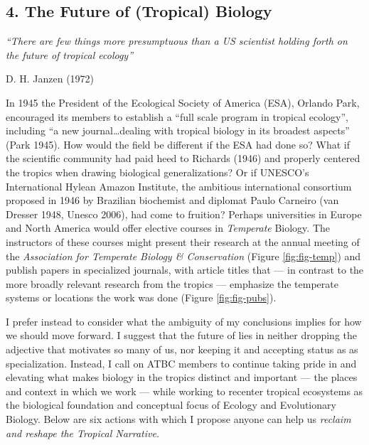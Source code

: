 \documentclass[
  12pt,
  man, donotrepeattitle,floatsintext]{apa6}
\begin{document}
\hypertarget{the-future-of-tropical-biology}{%
\subsection{4. The Future of (Tropical) Biology}\label{the-future-of-tropical-biology}}

\emph{``There are few things more presumptuous than a US scientist holding forth on the future of tropical ecology''}

\hfill D. H. Janzen (1972)

\bigskip

\noindent In 1945 the President of the Ecological Society of America (ESA), Orlando Park, encouraged its members to establish a ``full scale program in tropical ecology'', including ``a new journal\ldots dealing with tropical biology in its broadest aspects'' (Park 1945). How would the field be different if the ESA had done so? What if the scientific community had paid heed to Richards (1946) and properly centered the tropics when drawing biological generalizations? Or if UNESCO's International Hylean Amazon Institute, the ambitious international consortium proposed in 1946 by Brazilian biochemist and diplomat Paulo Carneiro (van Dresser 1948, Unesco 2006), had come to fruition? Perhaps universities in Europe and North America would offer elective courses in \emph{Temperate} Biology. The instructors of these courses might present their research at the annual meeting of the \emph{Association for Temperate Biology \& Conservation} (Figure \ref{fig:fig-temp}) and publish papers in specialized journals, with article titles that --- in contrast to the more broadly relevant research from the tropics --- emphasize the temperate systems or locations the work was done (Figure \ref{fig:fig-pubs}).

I prefer instead to consider what the ambiguity of my conclusions implies for how we should move forward. I suggest that the future of lies in neither dropping the adjective that motivates so many of us, nor keeping it and accepting status as as specialization. Instead, I call on ATBC members to continue taking pride in and elevating what makes biology in the tropics distinct and important --- the places and context in which we work --- while working to recenter tropical ecosystems as the biological foundation and conceptual focus of Ecology and Evolutionary Biology. Below are six actions with which I propose anyone can help us \emph{reclaim and reshape the Tropical Narrative}.
\end{document}

